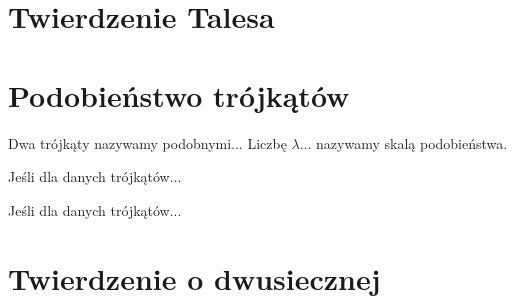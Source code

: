 %






\section{Twierdzenie Talesa}


\section{Podobieństwo trójkątów}
\begin{definition}
	Dwa trójkąty nazywamy podobnymi...
	Liczbę $\lambda$... nazywamy skalą podobieństwa.
\end{definition}

\begin{proposition}
	Jeśli dla danych trójkątów...
\end{proposition}

\begin{proposition}
	Jeśli dla danych trójkątów...
\end{proposition}




\section{Twierdzenie o dwusiecznej}

